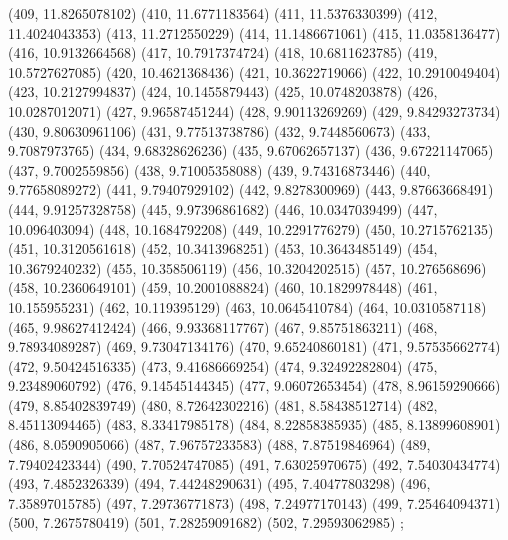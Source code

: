 {					(409, 11.8265078102)
					(410, 11.6771183564)
					(411, 11.5376330399)
					(412, 11.4024043353)
					(413, 11.2712550229)
					(414, 11.1486671061)
					(415, 11.0358136477)
					(416, 10.9132664568)
					(417, 10.7917374724)
					(418, 10.6811623785)
					(419, 10.5727627085)
					(420, 10.4621368436)
					(421, 10.3622719066)
					(422, 10.2910049404)
					(423, 10.2127994837)
					(424, 10.1455879443)
					(425, 10.0748203878)
					(426, 10.0287012071)
					(427, 9.96587451244)
					(428, 9.90113269269)
					(429, 9.84293273734)
					(430, 9.80630961106)
					(431, 9.77513738786)
					(432, 9.7448560673)
					(433, 9.7087973765)
					(434, 9.68328626236)
					(435, 9.67062657137)
					(436, 9.67221147065)
					(437, 9.7002559856)
					(438, 9.71005358088)
					(439, 9.74316873446)
					(440, 9.77658089272)
					(441, 9.79407929102)
					(442, 9.8278300969)
					(443, 9.87663668491)
					(444, 9.91257328758)
					(445, 9.97396861682)
					(446, 10.0347039499)
					(447, 10.096403094)
					(448, 10.1684792208)
					(449, 10.2291776279)
					(450, 10.2715762135)
					(451, 10.3120561618)
					(452, 10.3413968251)
					(453, 10.3643485149)
					(454, 10.3679240232)
					(455, 10.358506119)
					(456, 10.3204202515)
					(457, 10.276568696)
					(458, 10.2360649101)
					(459, 10.2001088824)
					(460, 10.1829978448)
					(461, 10.155955231)
					(462, 10.119395129)
					(463, 10.0645410784)
					(464, 10.0310587118)
					(465, 9.98627412424)
					(466, 9.93368117767)
					(467, 9.85751863211)
					(468, 9.78934089287)
					(469, 9.73047134176)
					(470, 9.65240860181)
					(471, 9.57535662774)
					(472, 9.50424516335)
					(473, 9.41686669254)
					(474, 9.32492282804)
					(475, 9.23489060792)
					(476, 9.14545144345)
					(477, 9.06072653454)
					(478, 8.96159290666)
					(479, 8.85402839749)
					(480, 8.72642302216)
					(481, 8.58438512714)
					(482, 8.45113094465)
					(483, 8.33417985178)
					(484, 8.22858385935)
					(485, 8.13899608901)
					(486, 8.0590905066)
					(487, 7.96757233583)
					(488, 7.87519846964)
					(489, 7.79402423344)
					(490, 7.70524747085)
					(491, 7.63025970675)
					(492, 7.54030434774)
					(493, 7.4852326339)
					(494, 7.44248290631)
					(495, 7.40477803298)
					(496, 7.35897015785)
					(497, 7.29736771873)
					(498, 7.24977170143)
					(499, 7.25464094371)
					(500, 7.2675780419)
					(501, 7.28259091682)
					(502, 7.29593062985)
				};

